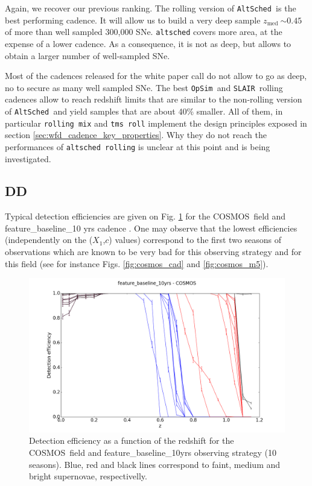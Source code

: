 \documentclass [11pt,a4paper]{article}
\newcommand{\cosmos}{COSMOS}
\newcommand{\strech}{$X_1$}
\newcommand{\sncolor}{$c$}
\newcommand{\zmed}{$z_{\mathrm{med}}\ $}
\newcommand{\opsim}{{\tt OpSim\ }}
\newcommand{\slair}{{\tt SLAIR\ }}
\newcommand{\altsched}{{\tt AltSched\ }}
\begin{document}
Again, we recover our previous ranking.  The rolling version of
\altsched is the best performing cadence.  It will allow us to build a
very deep sample \zmed $\sim 0.45$ of more than well sampled 300,000
SNe.  {\tt altsched} covers more area, at the expense of a lower
cadence.  As a consequence, it is not as deep, but allows to obtain a
larger number of well-sampled SNe.

Most of the cadences released for the white paper call do not allow to
go as deep, no to secure as many well sampled SNe. The best \opsim and
\slair rolling cadences allow to reach redshift limits that are
similar to the non-rolling version of \altsched and yield samples that
are about 40\% smaller. All of them, in particular {\tt rolling mix}
and {\tt tms roll} implement the design principles exposed in section
\ref{sec:wfd_cadence_key_properties}. Why they do not reach the
performances of {\tt altsched rolling} is unclear at this point and is
being investigated.




\subsection{ DD}

Typical detection efficiencies are given on Fig. \ref{fig:effi} for the \cosmos~field and feature\_baseline\_10 yrs cadence . One may observe that the lowest efficiencies (independently on the (\strech,\sncolor) values) correspond to the first two seasons of observations which are known to be very bad for this observing strategy and for this field (see for instance Figs. \ref{fig:cosmos_cad} and \ref{fig:cosmos_m5}).

\begin{figure}[htbp]
\begin{center}
  
  \includegraphics[width=12cm]{Figures/effi_feature_cosmos.png}
 \caption{Detection efficiency as a function of the redshift for the \cosmos~field and feature\_baseline\_10yrs observing strategy (10 seasons). Blue, red and black lines correspond to faint, medium and bright supernovae, respectivelly.}\label{fig:effi}
\end{center}
\end{figure}
\end{document}
